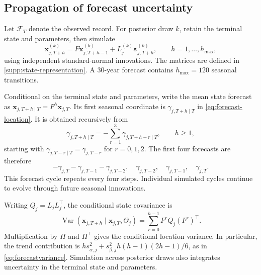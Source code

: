 \documentclass[11pt,a4paper]{article}
\begin{document}
	\subsection{Propagation of forecast uncertainty}
	
	Let \(\mathcal F_T\) denote the observed record. For posterior draw
	\(k\), retain the terminal state and parameters, then simulate
	\begin{equation}\label{eq:supp-forecast-simulation}
		\bm x_{j,T+h}^{(k)}
		=F\bm x_{j,T+h-1}^{(k)}
		+L_j^{(k)}\bm\varepsilon_{j,T+h}^{(k)},
		\qquad h=1,\ldots,h_{\max},
	\end{equation}
	using independent standard-normal innovations. The matrices are
	defined in \cref{supp:state-representation}. A 30-year forecast
	contains \(h_{\max}=120\) seasonal transitions.
	
	Conditional on the terminal state and parameters, write the mean
	state forecast as \(\bm x_{j,T+h\mid T}=F^h\bm x_{j,T}\).
	Its first seasonal coordinate is \(\gamma_{j,T+h\mid T}\) in
	\cref{eq:forecast-location}. It is obtained recursively from
	\begin{equation}\label{eq:supp-seasonal-forecast}
		\gamma_{j,T+h\mid T}
		=-\sum_{r=1}^{3}\gamma_{j,T+h-r\mid T},
		\qquad h\geq1,
	\end{equation}
	starting with \(\gamma_{j,T-r\mid T}=\gamma_{j,T-r}\) for
	\(r=0,1,2\). The first four forecasts are therefore
	\[
	-\gamma_{j,T}-\gamma_{j,T-1}-\gamma_{j,T-2},
	\quad\gamma_{j,T-2},\quad\gamma_{j,T-1},\quad\gamma_{j,T}.
	\]
	This forecast cycle repeats every four steps. Individual simulated
	cycles continue to evolve through future seasonal innovations.
	
	Writing \(Q_j=L_jL_j^\top\), the conditional state covariance is
	\begin{equation}\label{eq:supp-forecast-state-variance}
		\operatorname{Var}(\bm x_{j,T+h}\mid\bm x_{j,T},\Theta_j)
		=\sum_{r=0}^{h-1}F^r Q_j(F^r)^\top.
	\end{equation}
	Multiplication by \(H\) and \(H^\top\) gives the conditional
	location variance. In particular, the trend contribution is
	\(h s_{\alpha,j}^2+
	s_{\beta,j}^2h(h-1)(2h-1)/6\), as in
	\cref{eq:forecastvariance}. Simulation across posterior draws also
	integrates uncertainty in the terminal state and parameters.
	
\end{document}
